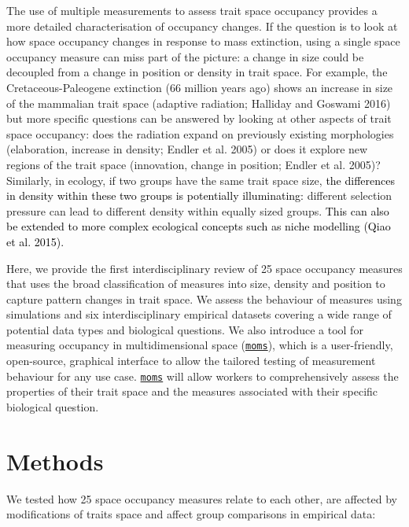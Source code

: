 \documentclass[]{article}
\begin{document}
The use of multiple measurements to assess trait space occupancy
provides a more detailed characterisation of occupancy changes. If the
question is to look at how space occupancy changes in response to mass
extinction, using a single space occupancy measure can miss part of the
picture: a change in size could be decoupled from a change in position
or density in trait space. For example, the Cretaceous-Paleogene
extinction (66 million years ago) shows an increase in size of the
mammalian trait space (adaptive radiation; Halliday and Goswami 2016)
but more specific questions can be answered by looking at other aspects
of trait space occupancy: does the radiation expand on previously
existing morphologies (elaboration, increase in density; Endler et al.
2005) or does it explore new regions of the trait space (innovation,
change in position; Endler et al. 2005)? Similarly, in ecology, if two
groups have the same trait space size,
\textcolor{black}{the differences in density within
these two groups is potentially illuminating:} different selection
pressure can lead to different density within equally sized groups.
\textcolor{black}{This can also be extended to more
complex ecological concepts such as niche modelling (Qiao et al.
2015).}

Here, we provide the first interdisciplinary review of 25 space
occupancy measures that uses the broad classification of measures into
size, density and position to capture pattern changes in trait space. We
assess the behaviour of measures using simulations and six
interdisciplinary empirical datasets covering a wide range of potential
data types and biological questions. We also introduce a tool for
measuring occupancy in multidimensional space
(\href{https://tguillerme.shinyapps.io/moms/}{\texttt{moms}}), which is
a user-friendly, open-source, graphical interface to allow the tailored
testing of measurement behaviour for any use case.
\href{https://tguillerme.shinyapps.io/moms/}{\texttt{moms}} will allow
workers to comprehensively assess the properties of their trait space
and the measures associated with their specific biological question.

\section{Methods}\label{methods}

We tested how 25 space occupancy measures relate to each other, are
affected by modifications of traits space and affect group comparisons
in empirical data:
\end{document}
